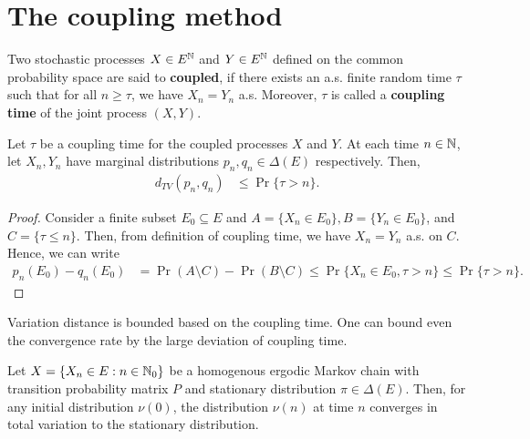\documentclass[a4paper,10pt,english]{article}
\begin{document}
\section{The coupling method}
Two stochastic processes $X \in E^{\mathbb{N}}$ and $Y \in E^{\mathbb{N}}$ defined on the common probability space %
are said to \textbf{coupled}, 
if there exists an a.s. finite random time $\tau$ such that for all $n \geq \tau$, we have $X_n = Y_n$ a.s. 
Moreover, $\tau$ is called a \textbf{coupling time} of the joint process $(X,Y)$. 
\begin{thm} Let $\tau$ be a coupling time for the coupled processes $X$ and $Y$. 
At each time $n \in \mathbb{N}$, let $X_n,Y_n$ have marginal distributions $p_n,q_n \in \Delta(E)$ respectively. 
Then, 
\begin{align*}
d_{TV} (p_n,q_n) &\leq \Pr\{\tau > n\}.
\end{align*}
\end{thm}
\begin{proof} Consider a finite subset $E_0 \subseteq E$ and $A = \{X_n \in E_0\}, B = \{Y_n \in E_0\}$, and $C = \{\tau \leq n\}$. 
Then, from definition of coupling time, we have $X_n = Y_n$ a.s. on $C$. Hence, we can write 
\begin{align*}
p_n(E_0) - q_n(E_0) &= %
\Pr(A \setminus C) - \Pr(B \setminus C) \leq \Pr\{X_n \in E_0, \tau > n\} \leq \Pr\{\tau > n\}.
\end{align*}
\end{proof}
Variation distance is bounded based on the coupling time. 
One can bound even the convergence rate by the large deviation of coupling time.
\begin{thm}
Let $X = \{X_n \in E: n \in \mathbb{N}_0 \}$ be a homogenous ergodic Markov chain with transition probability matrix $P$ and stationary distribution $\pi \in \Delta(E)$. 
Then, for any initial distribution $\nu(0)$, the distribution $\nu(n)$ at time $n$ converges in total variation to the stationary distribution. 
\end{thm}
\end{document}
